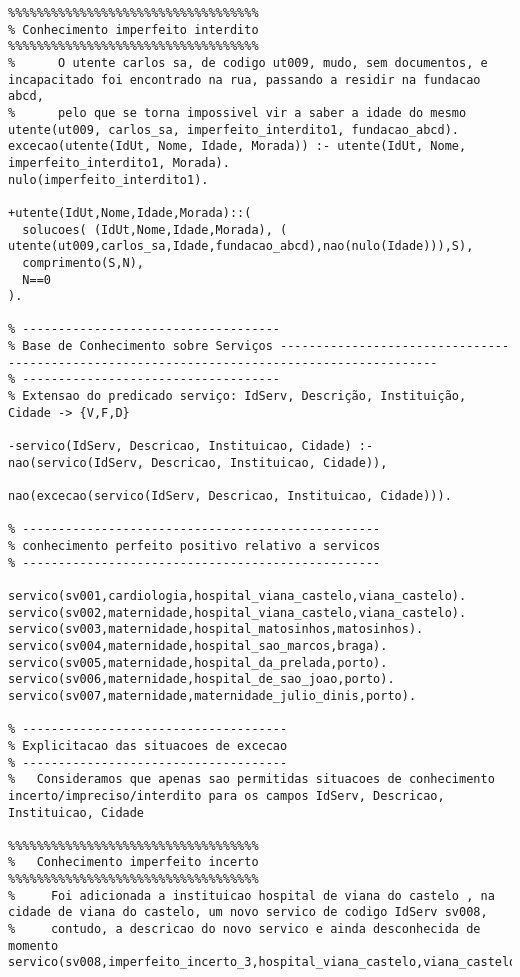 \documentclass[
  oneside,
  10pt, a4paper,
  footinclude=true,
  headinclude=true,
  cleardoublepage=empty
]{scrbook}
\begin{document}
\begin{lstlisting}
%%%%%%%%%%%%%%%%%%%%%%%%%%%%%%%%%%%
% Conhecimento imperfeito interdito
%%%%%%%%%%%%%%%%%%%%%%%%%%%%%%%%%%%
%      O utente carlos sa, de codigo ut009, mudo, sem documentos, e incapacitado foi encontrado na rua, passando a residir na fundacao abcd,
%      pelo que se torna impossivel vir a saber a idade do mesmo 
utente(ut009, carlos_sa, imperfeito_interdito1, fundacao_abcd).
excecao(utente(IdUt, Nome, Idade, Morada)) :- utente(IdUt, Nome, imperfeito_interdito1, Morada).
nulo(imperfeito_interdito1).

+utente(IdUt,Nome,Idade,Morada)::(
  solucoes( (IdUt,Nome,Idade,Morada), ( utente(ut009,carlos_sa,Idade,fundacao_abcd),nao(nulo(Idade))),S),
  comprimento(S,N),
  N==0
).

% ------------------------------------
% Base de Conhecimento sobre Serviços --------------------------------------------------------------------------------------------
% ------------------------------------
% Extensao do predicado serviço: IdServ, Descrição, Instituição, Cidade -> {V,F,D}

-servico(IdServ, Descricao, Instituicao, Cidade) :- nao(servico(IdServ, Descricao, Instituicao, Cidade)),
                                                    nao(excecao(servico(IdServ, Descricao, Instituicao, Cidade))).

% --------------------------------------------------
% conhecimento perfeito positivo relativo a servicos
% --------------------------------------------------

servico(sv001,cardiologia,hospital_viana_castelo,viana_castelo).
servico(sv002,maternidade,hospital_viana_castelo,viana_castelo).
servico(sv003,maternidade,hospital_matosinhos,matosinhos).
servico(sv004,maternidade,hospital_sao_marcos,braga).
servico(sv005,maternidade,hospital_da_prelada,porto).
servico(sv006,maternidade,hospital_de_sao_joao,porto).
servico(sv007,maternidade,maternidade_julio_dinis,porto).

% -------------------------------------
% Explicitacao das situacoes de excecao
% -------------------------------------
%   Consideramos que apenas sao permitidas situacoes de conhecimento incerto/impreciso/interdito para os campos IdServ, Descricao, Instituicao, Cidade

%%%%%%%%%%%%%%%%%%%%%%%%%%%%%%%%%%%
%   Conhecimento imperfeito incerto
%%%%%%%%%%%%%%%%%%%%%%%%%%%%%%%%%%%
%     Foi adicionada a instituicao hospital de viana do castelo , na cidade de viana do castelo, um novo servico de codigo IdServ sv008,
%     contudo, a descricao do novo servico e ainda desconhecida de momento
servico(sv008,imperfeito_incerto_3,hospital_viana_castelo,viana_castelo).


\end{lstlisting}
\end{document}
